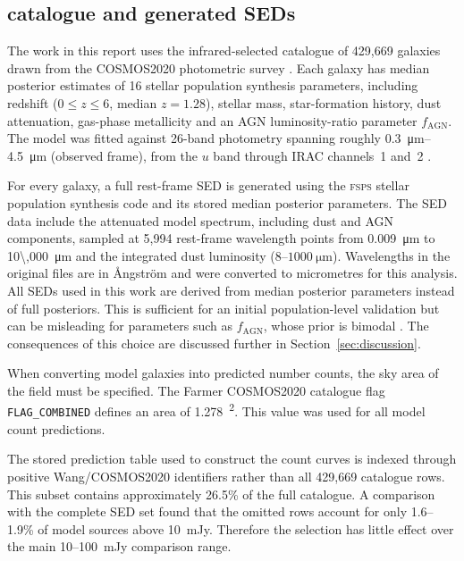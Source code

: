\documentclass[12pt,a4paper]{article}
\begin{document}
\subsection{\popcosmos{} catalogue and generated SEDs}
\label{sec:data:popcosmos}

The work in this report uses the infrared-selected \popcosmos{} catalogue of 429,669
galaxies drawn from the COSMOS2020 photometric survey
\citep{Thorp_2025_insights}. Each galaxy has
median posterior estimates of 16 stellar population synthesis parameters, including
redshift ($0 \leq z \leq 6$, median $z = 1.28$), stellar mass, star-formation history,
dust attenuation, gas-phase metallicity and an AGN luminosity-ratio parameter
$f_\mathrm{AGN}$. The model was fitted against 26-band photometry spanning roughly
\SIrange{0.3}{4.5}{\um} (observed frame), from the $u$ band through IRAC channels~1
and~2 \citep{Thorp_2025_insights}.

For every galaxy, a full rest-frame SED is generated using the \textsc{fsps} stellar
population synthesis code and its stored median posterior parameters. The SED data include
the attenuated model spectrum, including dust and AGN components, sampled at 5,994
rest-frame wavelength points from
\SI{0.009}{\um} to \SI{10\,000}{\um} and the integrated dust luminosity
\LIR{} ($8$--$\SI{1000}{\um}$). Wavelengths in the original files are in \AA ngstr\"om
and were converted to micrometres for this analysis. All SEDs used in this
work are derived from median posterior parameters instead of full posteriors. This is
sufficient for an initial population-level validation but can be misleading for
parameters such as $f_\mathrm{AGN}$, whose prior is bimodal
\citep{Thorp_2025_insights}. The consequences of this choice are discussed further in
Section~\ref{sec:discussion}.

When converting model galaxies into predicted number counts, the sky area of
the field must be specified. The Farmer COSMOS2020 catalogue flag
\texttt{FLAG\_COMBINED} defines an area of
\SI{1.278}{\deg\squared}. This value was used for all model count predictions.

The stored prediction table used to construct the count curves is indexed through
positive Wang/COSMOS2020 identifiers rather than all 429,669 catalogue rows. This subset
contains approximately 26.5\% of the full catalogue. A comparison with the complete SED
set found that the omitted rows account for only 1.6--1.9\% of model sources above
\SI{10}{mJy}. Therefore the selection has little effect over the main
10--\SI{100}{mJy} comparison range.
\end{document}
